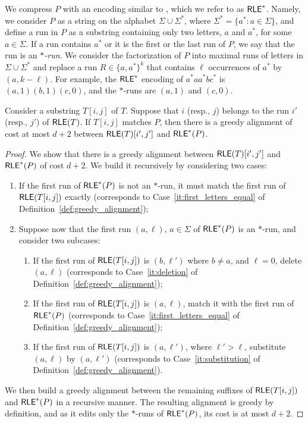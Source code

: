 \documentclass{article}
\begin{document}
We compress $P$ with an encoding similar to \RLE, which we refer to as $\textsf{RLE}^\ast$. Namely, we consider $P$ as a string on the alphabet $\Sigma \cup \Sigma^\ast$, where $ \Sigma^\ast = \{a^\ast: a\in \Sigma \}$, and define a run in $P$ as a substring containing only two letters, $a$ and $a^\ast$, for some $a\in \Sigma$. If a run contains $a^\ast$ or it is the first or the last run of $P$, we say that the run is an \emph{$\ast$-run}. We consider the factorization of $P$ into maximal runs of letters in $\Sigma \cup \Sigma^\ast$ and replace a run $R \in \{a, a^\ast \}^k$ that contains $\ell$ occurrences of $a^\ast$ by $(a,k-\ell)$. For example, the $\textsf{RLE}^\ast$ encoding of $a^\ast a a^\ast b c^\ast$ is $(a, 1) (b, 1) (c, 0)$, and the $\ast$-runs are $(a,1)$ and $(c,0)$.

\begin{observation}\label{obs:greedy_alignment}
Consider a substring $T[i,j]$ of $T$. Suppose that $i$ (resp., $j$) belongs to the run $i'$ (resp., $j'$) of $\textsf{RLE}(T)$. 
If $T[i,j]$ matches $P$, then there is a greedy alignment of cost at most $d+2$ between $\textsf{RLE}(T)[i',j']$ and $\textsf{RLE}^\ast (P)$. 
\end{observation}
\begin{proof}
We show that there is a greedy alignment between $\textsf{RLE}(T)[i',j']$ and $\textsf{RLE}^\ast (P)$ of cost $d+2$. We build it recursively by considering two cases:
\begin{enumerate}
\item If the first run of $\textsf{RLE}^\ast (P)$ is not an $\ast$-run, it must match the first run of $\textsf{RLE}(T[i,j])$ exactly (corresponds to Case~\ref{it:first_letters_equal} of Definition~\ref{def:greedy_alignment});
\item Suppose now that the first run $(a, \ell)$, $a \in \Sigma$ of $\textsf{RLE}^\ast (P)$ is an $\ast$-run, and consider two subcases:
	\begin{enumerate}
		\item If the first run of $\textsf{RLE}(T[i,j])$ is $(b, \ell')$ where $b \neq a$, and $\ell = 0$, delete $(a, \ell)$ (corresponds to Case~\ref{it:deletion} of Definition~\ref{def:greedy_alignment});
		\item If the first run of $\textsf{RLE}(T[i,j])$ is $(a, \ell)$, match it with the first run of  $\textsf{RLE}^\ast (P)$ (corresponds to Case~\ref{it:first_letters_equal} of Definition~\ref{def:greedy_alignment});		
		\item If the first run of $\textsf{RLE}(T[i,j])$ is $(a, \ell')$, where $\ell' > \ell$, substitute $(a, \ell)$ by $(a, \ell')$ (corresponds to Case~\ref{it:substitution} of Definition~\ref{def:greedy_alignment}).
	\end{enumerate}
\end{enumerate}
We then build a greedy alignment between the remaining suffixes of $\textsf{RLE}(T[i,j])$ and $\textsf{RLE}^\ast (P)$ in a recursive manner. The resulting alignment is greedy by definition, and as it edits only the $\ast$-runs of $\textsf{RLE}^\ast (P)$, its cost is at most $d+2$.
\end{proof}
\end{document}
